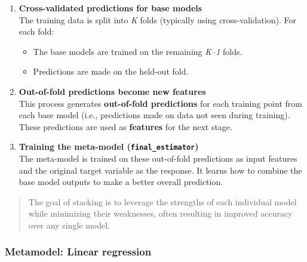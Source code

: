 \documentclass[
  letterpaper,
  DIV=11,
  numbers=noendperiod]{scrreprt}
\providecommand{\tightlist}{%
  \setlength{\itemsep}{0pt}\setlength{\parskip}{0pt}}\usepackage{longtable,booktabs,array}
\begin{document}
\begin{enumerate}
\def\labelenumi{\arabic{enumi}.}
\item
  \textbf{Cross-validated predictions for base models}\\
  The training data is split into \emph{K} folds (typically using
  cross-validation). For each fold:

  \begin{itemize}
  \tightlist
  \item
    The base models are trained on the remaining \emph{K--1} folds.
  \item
    Predictions are made on the held-out fold.
  \end{itemize}
\item
  \textbf{Out-of-fold predictions become new features}\\
  This process generates \textbf{out-of-fold predictions} for each
  training point from each base model (i.e., predictions made on data
  not seen during training). These predictions are used as
  \textbf{features} for the next stage.
\item
  \textbf{Training the meta-model (\texttt{final\_estimator})}\\
  The meta-model is trained on these out-of-fold predictions as input
  features and the original target variable as the response. It learns
  how to combine the base model outputs to make a better overall
  prediction.
\end{enumerate}

\begin{quote}
The goal of stacking is to leverage the strengths of each individual
model while minimizing their weaknesses, often resulting in improved
accuracy over any single model.
\end{quote}

\subsubsection{Metamodel: Linear
regression}\label{metamodel-linear-regression}
\end{document}
